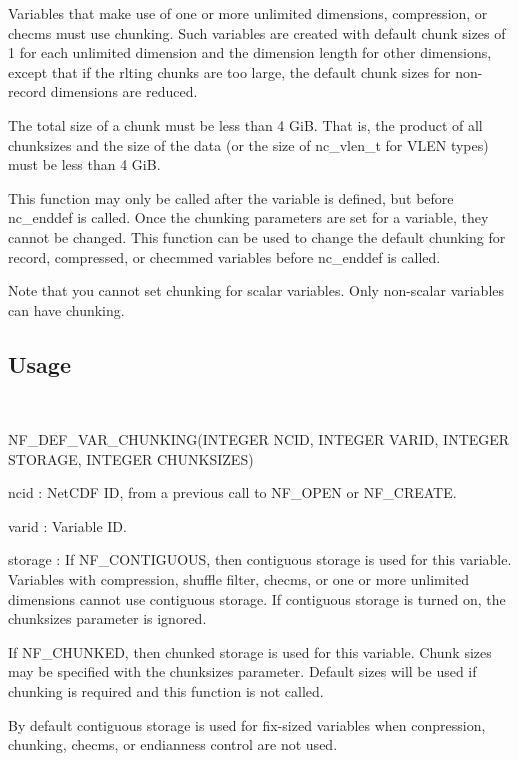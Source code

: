 Variables that make use of one or more unlimited dimensions, compression, or checms must use chunking. Such variables are created with default chunk sizes of 1 for each unlimited dimension and the dimension length for other dimensions, except that if the rlting chunks are too large, the default chunk sizes for non-\/record dimensions are reduced.

The total size of a chunk must be less than 4 GiB. That is, the product of all chunksizes and the size of the data (or the size of nc\+\_\+vlen\+\_\+t for V\+L\+EN types) must be less than 4 GiB.

This function may only be called after the variable is defined, but before nc\+\_\+enddef is called. Once the chunking parameters are set for a variable, they cannot be changed. This function can be used to change the default chunking for record, compressed, or checmmed variables before nc\+\_\+enddef is called.

Note that you cannot set chunking for scalar variables. Only non-\/scalar variables can have chunking.

\subsection*{Usage }

 

N\+F\+\_\+\+D\+E\+F\+\_\+\+V\+A\+R\+\_\+\+C\+H\+U\+N\+K\+I\+N\+G(\+I\+N\+T\+E\+G\+E\+R N\+C\+I\+D, I\+N\+T\+E\+G\+E\+R V\+A\+R\+I\+D, I\+N\+T\+E\+G\+E\+R S\+T\+O\+R\+A\+G\+E, I\+N\+T\+E\+G\+E\+R C\+H\+U\+N\+K\+S\+I\+Z\+E\+S)

{\ttfamily ncid} \+: Net\+C\+DF ID, from a previous call to N\+F\+\_\+\+O\+P\+EN or N\+F\+\_\+\+C\+R\+E\+A\+TE.

{\ttfamily varid} \+: Variable ID.

{\ttfamily storage} \+: If N\+F\+\_\+\+C\+O\+N\+T\+I\+G\+U\+O\+US, then contiguous storage is used for this variable. Variables with compression, shuffle filter, checms, or one or more unlimited dimensions cannot use contiguous storage. If contiguous storage is turned on, the chunksizes parameter is ignored.

If N\+F\+\_\+\+C\+H\+U\+N\+K\+ED, then chunked storage is used for this variable. Chunk sizes may be specified with the chunksizes parameter. Default sizes will be used if chunking is required and this function is not called.

By default contiguous storage is used for fix-\/sized variables when conpression, chunking, checms, or endianness control are not used.

